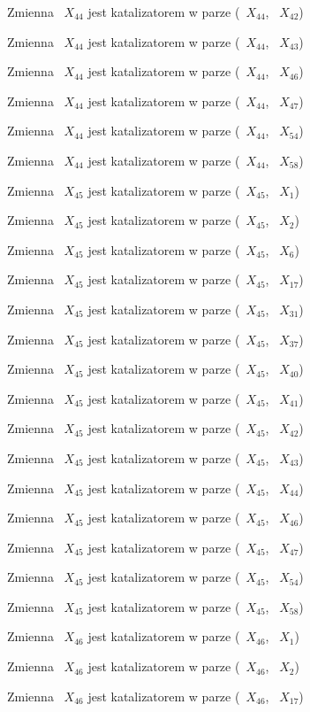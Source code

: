 \documentclass{article}
\begin{document}
Zmienna ~$X_{44}$ jest katalizatorem w parze (~$X_{44}$, ~$X_{42}$)

Zmienna ~$X_{44}$ jest katalizatorem w parze (~$X_{44}$, ~$X_{43}$)

Zmienna ~$X_{44}$ jest katalizatorem w parze (~$X_{44}$, ~$X_{46}$)

Zmienna ~$X_{44}$ jest katalizatorem w parze (~$X_{44}$, ~$X_{47}$)

Zmienna ~$X_{44}$ jest katalizatorem w parze (~$X_{44}$, ~$X_{54}$)

Zmienna ~$X_{44}$ jest katalizatorem w parze (~$X_{44}$, ~$X_{58}$)

Zmienna ~$X_{45}$ jest katalizatorem w parze (~$X_{45}$, ~$X_{1}$)

Zmienna ~$X_{45}$ jest katalizatorem w parze (~$X_{45}$, ~$X_{2}$)

Zmienna ~$X_{45}$ jest katalizatorem w parze (~$X_{45}$, ~$X_{6}$)

Zmienna ~$X_{45}$ jest katalizatorem w parze (~$X_{45}$, ~$X_{17}$)

Zmienna ~$X_{45}$ jest katalizatorem w parze (~$X_{45}$, ~$X_{31}$)

Zmienna ~$X_{45}$ jest katalizatorem w parze (~$X_{45}$, ~$X_{37}$)

Zmienna ~$X_{45}$ jest katalizatorem w parze (~$X_{45}$, ~$X_{40}$)

Zmienna ~$X_{45}$ jest katalizatorem w parze (~$X_{45}$, ~$X_{41}$)

Zmienna ~$X_{45}$ jest katalizatorem w parze (~$X_{45}$, ~$X_{42}$)

Zmienna ~$X_{45}$ jest katalizatorem w parze (~$X_{45}$, ~$X_{43}$)

Zmienna ~$X_{45}$ jest katalizatorem w parze (~$X_{45}$, ~$X_{44}$)

Zmienna ~$X_{45}$ jest katalizatorem w parze (~$X_{45}$, ~$X_{46}$)

Zmienna ~$X_{45}$ jest katalizatorem w parze (~$X_{45}$, ~$X_{47}$)

Zmienna ~$X_{45}$ jest katalizatorem w parze (~$X_{45}$, ~$X_{54}$)

Zmienna ~$X_{45}$ jest katalizatorem w parze (~$X_{45}$, ~$X_{58}$)

Zmienna ~$X_{46}$ jest katalizatorem w parze (~$X_{46}$, ~$X_{1}$)

Zmienna ~$X_{46}$ jest katalizatorem w parze (~$X_{46}$, ~$X_{2}$)

Zmienna ~$X_{46}$ jest katalizatorem w parze (~$X_{46}$, ~$X_{17}$)
\end{document}
